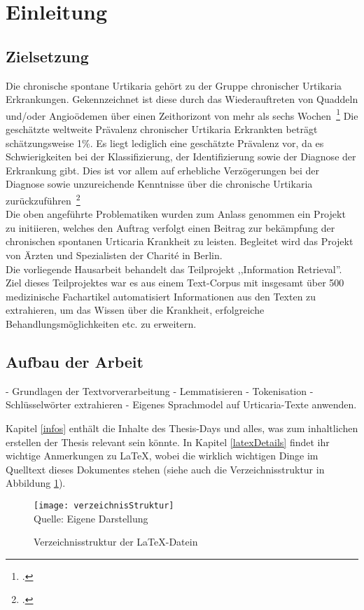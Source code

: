 \section{Einleitung}

\subsection{Zielsetzung}

Die chronische spontane Urtikaria gehört zu der Gruppe chronischer Urtikaria Erkrankungen. Gekennzeichnet ist diese
durch das Wiederauftreten von Quaddeln und/oder Angioödemen über einen Zeithorizont von mehr als sechs
Wochen~\footcite[\vglf][]{savic.2020}
Die geschätzte weltweite Prävalenz chronischer Urtikaria Erkrankten beträgt schätzungsweise 1\%. Es liegt lediglich eine
geschätzte Prävalenz vor, da es Schwierigkeiten bei der Klassifizierung, der Identifizierung sowie der Diagnose der
Erkrankung gibt. Dies ist vor allem auf erhebliche Verzögerungen bei der Diagnose sowie unzureichende Kenntnisse über
die chronische Urtikaria zurückzuführen~\footcite[\vglf][]{savic.2020}\\

Die oben angeführte Problematiken wurden zum Anlass genommen ein Projekt zu initiieren, welches den Auftrag verfolgt
einen Beitrag zur bekämpfung der chronischen spontanen Urticaria Krankheit zu leisten. Begleitet wird das Projekt von
Ärzten und Spezialisten der Charité in Berlin.\\

Die vorliegende Hausarbeit behandelt das Teilprojekt ,,Information Retrieval''. Ziel dieses Teilprojektes war es aus einem
Text-Corpus mit insgesamt über 500 medizinische Fachartikel automatisiert Informationen aus den Texten zu extrahieren,
um das Wissen über die Krankheit, erfolgreiche Behandlungsmöglichkeiten etc. zu erweitern.\\

\subsection{Aufbau der Arbeit}
- Grundlagen der Textvorverarbeitung
- Lemmatisieren
- Tokenisation
- Schlüsselwörter extrahieren
- Eigenes Sprachmodel auf Urticaria-Texte anwenden.

Kapitel \ref{infos} enthält die Inhalte des Thesis-Days und alles, was zum inhaltlichen erstellen der Thesis relevant sein könnte.
In Kapitel \ref{latexDetails}  findet ihr wichtige Anmerkungen zu \LaTeX{}, wobei die wirklich wichtigen Dinge im Quelltext dieses Dokumentes stehen (siehe auch die Verzeichnisstruktur in Abbildung \ref{fig:verzeichnisStruktur}).


\begin{figure}[H]
\caption{Verzeichnisstruktur der \LaTeX{}-Datein}\label{fig:verzeichnisStruktur}
\texttt{[image: verzeichnisStruktur]}
\\
Quelle: Eigene Darstellung
\end{figure}

